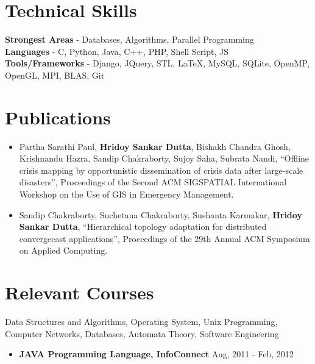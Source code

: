 \documentclass[margin, centered]{res}
\begin{document}
\begin{resume}
\section{Technical \hspace{2mm} Skills}
\textbf{Strongest Areas} - Databases, Algorithms, Parallel Programming \\
\textbf{Languages} - C, Python, Java, C++, PHP, Shell Script, JS\\
\textbf{Tools/Frameworks} - Django, JQuery, STL, \LaTeX, MySQL, SQLite, OpenMP, OpenGL, MPI, BLAS, Git


\section{Publications}
\begin{itemize}[leftmargin=*]
\item Partha Sarathi Paul, \textbf{Hridoy Sankar Dutta}, Bishakh Chandra Ghosh, Krishnandu Hazra, Sandip Chakraborty, Sujoy Saha, Subrata Nandi, ``Offline crisis mapping by opportunistic dissemination of crisis data after large-scale disasters'', Proceedings of the Second ACM SIGSPATIAL International Workshop on the Use of GIS in Emergency Management.
\item Sandip Chakraborty, Suchetana Chakraborty, Sushanta Karmakar, \textbf{Hridoy Sankar Dutta}, ``Hierarchical topology adaptation for distributed convergecast applications'', Proceedings of the 29th Annual ACM Symposium on Applied Computing.
\end{itemize}

\section{Relevant \hspace{2mm} Courses}
Data Structures and Algorithms, Operating System, Unix Programming, Computer Networks, Databases, Automata Theory, Software Engineering
\begin{itemize}[leftmargin=*]
\item \textbf{JAVA Programming Language, InfoConnect} \hfill Aug, 2011 - Feb, 2012 \\
\end{itemize}

\end{resume}
\end{document}
